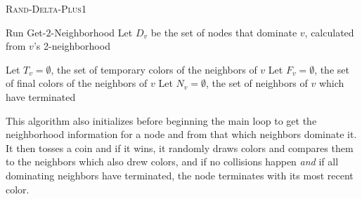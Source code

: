 \begin{algorithm}[ht]
\DontPrintSemicolon 
\caption{\textsc{Rand-Delta-Plus1}}\label{alg:rd+1}

Run Get-$2$-Neighborhood \;
Let $D_v$ be the set of nodes that dominate $v$, calculated from $v$'s 2-neighborhood\;

Let $T_v = \emptyset$, the set of temporary colors of the neighbors of $v$\;
Let $F_v = \emptyset$, the set of final colors of the neighbors of $v$\;
Let $N_v = \emptyset$, the set of neighbors of $v$ which have terminated\;



\end{algorithm}

This algorithm also initializes before beginning the main loop to get the neighborhood information for a node and from that which neighbors dominate it. It then tosses a coin and if it wins, it randomly draws colors and compares them to the neighbors which also drew colors, and if no collisions happen \textit{and} if all dominating neighbors have terminated, the node terminates with its most recent color.

